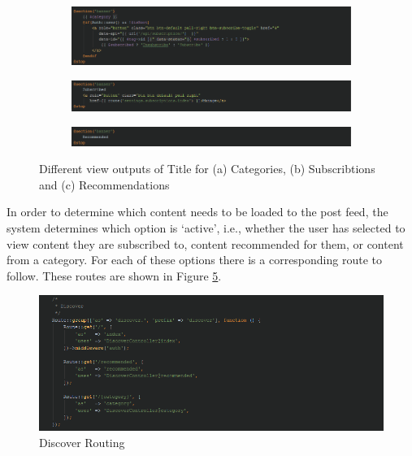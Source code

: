 \begin{figure}[H]
\centering
\begin{subfigure}[b]{1\linewidth}
	\includegraphics[width=\textwidth]{Images/Implementation/CategoryBladePhp}
	\caption{}
	\label{fig:CategoryBladePhp}
\end{subfigure}
\begin{subfigure}[b]{1\linewidth}
	\includegraphics[width=\textwidth]{Images/Implementation/IndexBladePhp}
	\caption{}
	\label{fig:IndexBladePhp}
\end{subfigure}
\begin{subfigure}[b]{1\linewidth}
	\includegraphics[width=\textwidth]{Images/Implementation/RecommendedBladePhp}
	\caption{}
	\label{fig:RecommendedBladePhp}
\end{subfigure}
\caption{Different view outputs of Title for (a) Categories, (b) Subscribtions and (c) Recommendations}
\label{fig:DiscoverTitle}
\end{figure}

In order to determine which content needs to be loaded to the post feed, the system determines which option is `active', i.e., whether the user has selected to view content they are subscribed to, content recommended for them, or content from a category. For each of these options there is a corresponding route to follow. These routes are shown in Figure \ref{fig:DiscoverRouting}.

\begin{figure}[H]
\centering
\includegraphics[width=\textwidth]{Images/Implementation/DiscoverRouting}
\caption{Discover Routing}
\label{fig:DiscoverRouting}
\end{figure}


